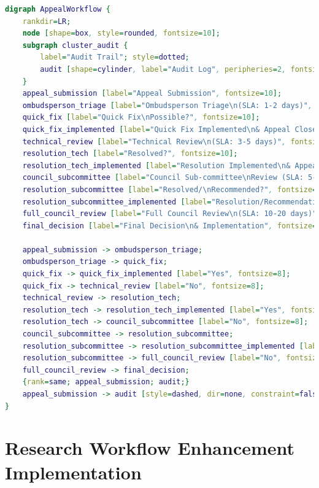 \documentclass[sigconf,natbib]{acmart}
\begin{document}
\begin{lstlisting}[language=DOT, caption={Complete DOT language specification for the Appeal and Dispute Resolution Workflow. Compile using Graphviz to generate the flowchart shown in \Cref{fig:appeal_workflow}.}, label=lst:appeal_workflow_dot_appendix, basicstyle=\ttfamily\scriptsize, numbers=none]
digraph AppealWorkflow {
    rankdir=LR;
    node [shape=box, style=rounded, fontsize=10];
    subgraph cluster_audit {
        label="Audit Trail"; style=dotted;
        audit [shape=cylinder, label="Audit Log", peripheries=2, fontsize=10];
    }
    appeal_submission [label="Appeal Submission", fontsize=10];
    ombudsperson_triage [label="Ombudsperson Triage\n(SLA: 1-2 days)", fontsize=10];
    quick_fix [label="Quick Fix\nPossible?", fontsize=10];
    quick_fix_implemented [label="Quick Fix Implemented\n& Appeal Closed", fontsize=10];
    technical_review [label="Technical Review\n(SLA: 3-5 days)", fontsize=10];
    resolution_tech [label="Resolved?", fontsize=10];
    resolution_tech_implemented [label="Resolution Implemented\n& Appeal Closed", fontsize=10];
    council_subcommittee [label="Council Sub-committee\nReview (SLA: 5-10 days)", fontsize=10];
    resolution_subcommittee [label="Resolved/\nRecommended?", fontsize=10];
    resolution_subcommittee_implemented [label="Resolution/Recommendation\nImplemented & Appeal Closed", fontsize=10];
    full_council_review [label="Full Council Review\n(SLA: 10-20 days)", fontsize=10];
    final_decision [label="Final Decision\n& Implementation", fontsize=10];

    appeal_submission -> ombudsperson_triage;
    ombudsperson_triage -> quick_fix;
    quick_fix -> quick_fix_implemented [label="Yes", fontsize=8];
    quick_fix -> technical_review [label="No", fontsize=8];
    technical_review -> resolution_tech;
    resolution_tech -> resolution_tech_implemented [label="Yes", fontsize=8];
    resolution_tech -> council_subcommittee [label="No", fontsize=8];
    council_subcommittee -> resolution_subcommittee;
    resolution_subcommittee -> resolution_subcommittee_implemented [label="Yes", fontsize=8];
    resolution_subcommittee -> full_council_review [label="No", fontsize=8];
    full_council_review -> final_decision;
    {rank=same; appeal_submission; audit;}
    appeal_submission -> audit [style=dashed, dir=none, constraint=false];
}
\end{lstlisting}

\section{Research Workflow Enhancement Implementation}
\label{app:research_workflow_enhancement}
\end{document}
